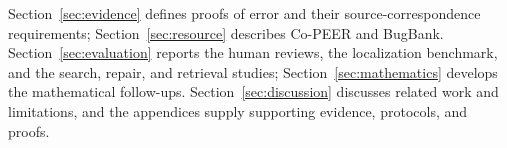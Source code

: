 Section~\ref{sec:evidence} defines proofs of error and their source-correspondence requirements; Section~\ref{sec:resource} describes Co-PEER and BugBank. Section~\ref{sec:evaluation} reports the human reviews, the localization benchmark, and the search, repair, and retrieval studies; Section~\ref{sec:mathematics} develops the mathematical follow-ups. Section~\ref{sec:discussion} discusses related work and limitations, and the appendices supply supporting evidence, protocols, and proofs.
